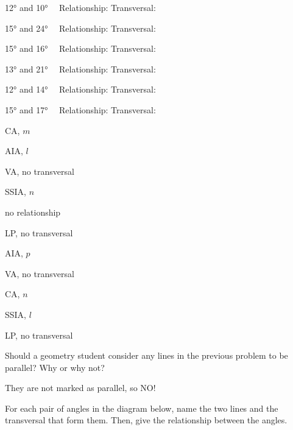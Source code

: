\begin{exercises}
\begin{ex}
\begin{exparts}
	\item \ang{12} and \ang{10}~~
	Relationship: \hfill  Transversal:  \hfill

	\item \ang{15} and \ang{24}~~
	Relationship: \hfill  Transversal:  \hfill
	
	\item \ang{15} and \ang{16}~~
	Relationship: \hfill  Transversal:  \hfill

	\item \ang{13} and \ang{21}~~
	Relationship: \hfill  Transversal:  \hfill
	
	\item \ang{12} and \ang{14}~~
	Relationship: \hfill  Transversal:  \hfill
	
	\item \ang{15} and \ang{17}~~
	Relationship: \hfill  Transversal:  \hfill
\end{exparts}
\begin{sol}
\hspace*{\fill}
\begin{exparts}
	\item CA, $m$ \item AIA, $l$ \item VA, no transversal \item SSIA, $n$ \item no relationship \item LP, no transversal \item AIA, $p$ \item VA, no transversal \item CA, $n$ \item SSIA, $l$ \item LP, no transversal
\end{exparts}
\end{sol}
\end{ex}
	\begin{ex}
	\e Should a geometry student  consider any lines in the previous problem to be parallel?
	Why or why not?\\
	\begin{sol} They are not marked as parallel, so NO! \end{sol}
	\end{ex}
	
	\smallskip
	\newpage
	
	\begin{ex}
	\e For each pair of angles in the diagram below,
	name the two lines and the transversal that form them.
	Then, give the relationship between the angles.


\end{ex}
\end{exercises}
